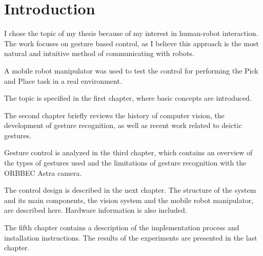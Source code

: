 \chapter*{Introduction}
I chose the topic of my thesis because of my interest in human-robot interaction. The work focuses on gesture based control, as I believe this approach is the most natural and intuitive method of communicating with robots.\par
A mobile robot manipulator was used to test the control for performing the Pick and Place task in a real environment.\par
The topic is specified in the first chapter, where basic concepts are introduced.\par
The second chapter briefly reviews the history of computer vision, the development of gesture recognition, as well as recent work related to deictic gestures.\par
Gesture control is analyzed in the third chapter, which contains an overview of the types of gestures used and the limitations of gesture recognition with the ORBBEC Astra camera.\par
The control design is described in the next chapter. The structure of the system and its main components, the vision system and the mobile robot manipulator, are described here. Hardware information is also included.\par
The fifth chapter contains a description of the implementation process and installation instructions.
The results of the experiments are presented in the last chapter.\par